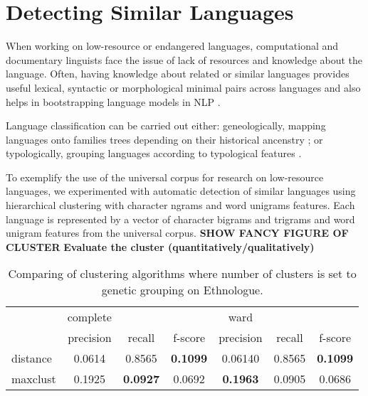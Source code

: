 \section{Detecting Similar Languages} \label{sec:cluster}

When working on low-resource or endangered languages, computational and documentary linguists face the issue of lack of resources and knowledge about the language. Often, having knowledge about related or similar languages provides useful lexical, syntactic or morphological minimal pairs across languages and also helps in bootstrapping language models in NLP \cite{yarowsky:ngai:2001,xia2007multilingual}.

Language classification can be carried out either: geneologically, mapping languages onto families trees depending on their historical ancenstry \cite{swadesh1952,starostin2010}; or typologically, grouping languages according to typological features \cite{georgi2010wals,daume2009}.

To exemplify the use of the universal corpus for research on low-resource languages, we experimented with automatic detection of similar languages using hierarchical clustering with character ngrams and word unigrams features. Each language is represented by a vector of character bigrams and trigrams and word unigram features from the universal corpus. 
\newline \newline
\noindent \textbf{SHOW FANCY FIGURE OF CLUSTER}
\newline \newline
\textbf{Evaluate the cluster (quantitatively/qualitatively)}


\begin{table*}[h!]
\begin{centering}

    \begin{tabular}{l|ccc|ccc}
    ~        & complete & ~       & ~       & ward    & ~       & ~       \\ \cline{2-7}
    ~        & precision & recall       & f-score       & precision    & recall       & f-score      \\ \hline
    distance & 0.0614   & 0.8565 & \textbf{0.1099} & 0.06140  & 0.8565 & \textbf{0.1099} \\
    maxclust & 0.1925  & \textbf{0.0927} & 0.0692 & \textbf{0.1963} & 0.0905 & 0.0686  \\
    \end{tabular}
\caption{Comparing of clustering algorithms where number of clusters is set to genetic grouping on Ethnologue.}
\end{centering}
\label{tab:cluster}
\end{table*}



